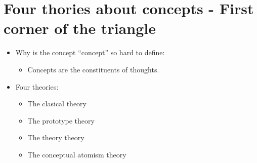 \section{Four thories about concepts - First corner of the triangle}
\begin{itemize}
    \item Why is the concept ``concept'' so hard to define:
        \begin{itemize}
            \item Concepts are the constituents of thoughts.
        \end{itemize}
    
    \item Four theories:
        \begin{itemize}
            \item The clasical theory 
            \item The prototype theory 
            \item The theory theory 
            \item The conceptual atomism theory 
        \end{itemize}
\end{itemize}



